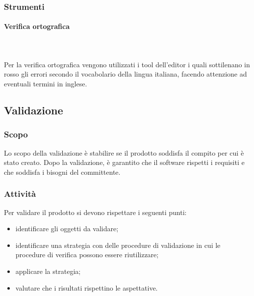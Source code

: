 	\subsubsection{Strumenti}
		\paragraph{Verifica ortografica} \mbox{}\\ \mbox{}\\
		Per la verifica ortografica vengono utilizzati i tool dell'editor i quali sottilenano in rosso gli errori secondo il vocabolario della lingua italiana, facendo attenzione ad eventuali termini in inglese.
	
\subsection{Validazione}
	\subsubsection{Scopo}
	Lo scopo della validazione è stabilire se il prodotto soddisfa il compito per cui è stato creato. Dopo la validazione, è garantito che il software rispetti i requisiti e che soddisfa i bisogni del committente.

	\subsubsection{Attività}
	Per validare il prodotto si devono rispettare i seguenti punti:
	\begin{itemize}
		\item identificare gli oggetti da validare;
		\item identificare una strategia con delle procedure di validazione in cui le procedure di verifica possono essere riutilizzare;
		\item applicare la strategia;
		\item valutare che i risultati rispettino le aspettative.
	\end{itemize}
